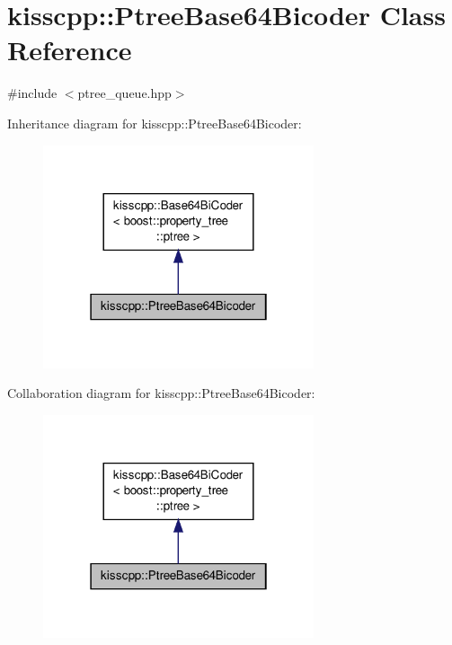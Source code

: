 \hypertarget{classkisscpp_1_1_ptree_base64_bicoder}{\section{kisscpp\-:\-:Ptree\-Base64\-Bicoder Class Reference}
\label{classkisscpp_1_1_ptree_base64_bicoder}
}


{\ttfamily \#include $<$ptree\-\_\-queue.\-hpp$>$}



Inheritance diagram for kisscpp\-:\-:Ptree\-Base64\-Bicoder\-:
\nopagebreak
\begin{figure}[H]
\begin{center}
\leavevmode
\includegraphics[width=226pt]{classkisscpp_1_1_ptree_base64_bicoder__inherit__graph}
\end{center}
\end{figure}


Collaboration diagram for kisscpp\-:\-:Ptree\-Base64\-Bicoder\-:
\nopagebreak
\begin{figure}[H]
\begin{center}
\leavevmode
\includegraphics[width=226pt]{classkisscpp_1_1_ptree_base64_bicoder__coll__graph}
\end{center}
\end{figure}
